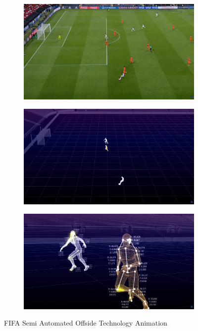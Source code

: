 \documentclass[12pt]{article}
\begin{document}
	\begin{figure}[ht!]
		\centering
		\begin{subfigure}[b]{0.35\textwidth}
			\includegraphics[width=\textwidth]{pic2.png}
		\end{subfigure}
		\begin{subfigure}[b]{0.35\textwidth}
			\includegraphics[width=\textwidth]{pic3.png}
		\end{subfigure}
		\begin{subfigure}[b]{0.71\textwidth}
			\includegraphics[width=\textwidth]{pic4.png}
		\end{subfigure}
		
		\caption{FIFA Semi Automated Offside Technology Animation\cite{fifa}}
	\end{figure}
\end{document}

